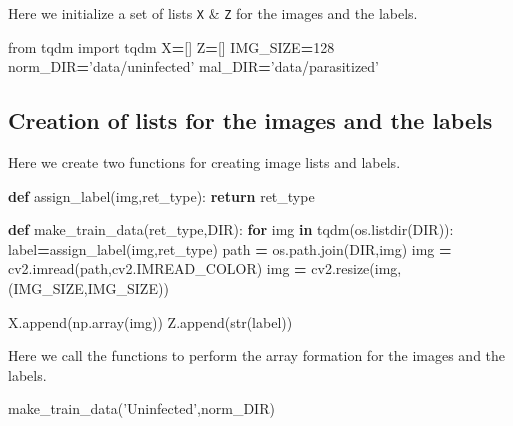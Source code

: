 \documentclass[]{book}
\newenvironment{Shaded}{\begin{snugshade}}{\end{snugshade}}
\newcommand{\BuiltInTok}[1]{#1}
\newcommand{\ControlFlowTok}[1]{\textcolor[rgb]{0.13,0.29,0.53}{\textbf{#1}}}
\newcommand{\DecValTok}[1]{\textcolor[rgb]{0.00,0.00,0.81}{#1}}
\newcommand{\ImportTok}[1]{#1}
\newcommand{\KeywordTok}[1]{\textcolor[rgb]{0.13,0.29,0.53}{\textbf{#1}}}
\newcommand{\NormalTok}[1]{#1}
\newcommand{\OperatorTok}[1]{\textcolor[rgb]{0.81,0.36,0.00}{\textbf{#1}}}
\newcommand{\StringTok}[1]{\textcolor[rgb]{0.31,0.60,0.02}{#1}}
\begin{document}
Here we initialize a set of lists \texttt{X} \& \texttt{Z} for the images and the labels.

\begin{Shaded}
\begin{Highlighting}[]
\ImportTok{from}\NormalTok{ tqdm }\ImportTok{import}\NormalTok{ tqdm}
\NormalTok{X}\OperatorTok{=}\NormalTok{[]}
\NormalTok{Z}\OperatorTok{=}\NormalTok{[]}
\NormalTok{IMG_SIZE}\OperatorTok{=}\DecValTok{128}
\NormalTok{norm_DIR}\OperatorTok{=}\StringTok{'data/uninfected'}
\NormalTok{mal_DIR}\OperatorTok{=}\StringTok{'data/parasitized'}
\end{Highlighting}
\end{Shaded}

\hypertarget{creation-of-lists-for-the-images-and-the-labels}{%
\subsection{Creation of lists for the images and the labels}\label{creation-of-lists-for-the-images-and-the-labels}}

Here we create two functions for creating image lists and labels.

\begin{Shaded}
\begin{Highlighting}[]
\KeywordTok{def}\NormalTok{ assign_label(img,ret_type):}
    \ControlFlowTok{return}\NormalTok{ ret_type}

\KeywordTok{def}\NormalTok{ make_train_data(ret_type,DIR):}
    \ControlFlowTok{for}\NormalTok{ img }\KeywordTok{in}\NormalTok{ tqdm(os.listdir(DIR)):}
\NormalTok{        label}\OperatorTok{=}\NormalTok{assign_label(img,ret_type)}
\NormalTok{        path }\OperatorTok{=}\NormalTok{ os.path.join(DIR,img)}
\NormalTok{        img }\OperatorTok{=}\NormalTok{ cv2.imread(path,cv2.IMREAD_COLOR)}
\NormalTok{        img }\OperatorTok{=}\NormalTok{ cv2.resize(img, (IMG_SIZE,IMG_SIZE))}
        
\NormalTok{        X.append(np.array(img))}
\NormalTok{        Z.append(}\BuiltInTok{str}\NormalTok{(label))}
    
\end{Highlighting}
\end{Shaded}

Here we call the functions to perform the array formation for the images and the labels.

\begin{Shaded}
\begin{Highlighting}[]
\NormalTok{make_train_data(}\StringTok{'Uninfected'}\NormalTok{,norm_DIR)}
\end{Highlighting}
\end{Shaded}
\end{document}
